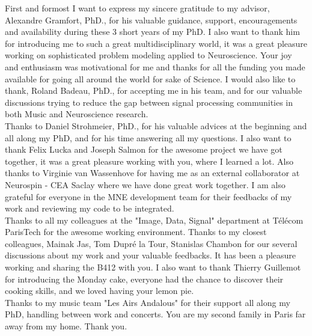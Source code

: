 
\begin{acknowledgements}
\addchaptertocentry{\acknowledgementname} %

First and formost I want to express my sincere gratitude to my advisor, Alexandre Gramfort, PhD., for his valuable guidance, support, encouragements and availability during these 3 short years of my PhD. I also want to thank him for introducing me to such a great multidisciplinary world, it was a great pleasure working on sophisticated problem modeling applied to Neuroscience. Your joy and enthusiasm was motivational for me and thanks for all the funding you made available for going all around the world for sake of Science. I would also like to thank, Roland Badeau, PhD., for accepting me in his team, and for our valuable discussions trying to reduce the gap between signal processing communities in both Music and Neuroscience research.\\

Thanks to Daniel Strohmeier, PhD., for his valuable advices at the beginning and all along my PhD, and for his time answering all my questions. I also want to thank Felix Lucka and Joseph Salmon for the awesome project we have got together, it was a great pleasure working with you, where I learned a lot. Also thanks to Virginie van Wassenhove for having me as an external collaborator at Neurospin - CEA Saclay where we have done great work together. I am also grateful for everyone in the MNE development team for their feedbacks of my work and reviewing my code to be integrated.
\\

Thanks to all my colleagues at the "Image, Data, Signal" department at Télécom ParisTech for the awesome working environment. Thanks to my closest colleagues, Mainak Jas, Tom Dupré la Tour, Stanislas Chambon for our several discussions about my work and your valuable feedbacks. It has been a pleasure working and sharing the B412 with you. I also want to thank Thierry Guillemot for introducing the Monday cake, everyone had the chance to discover their cooking skills, and we loved having your lemon pie.\\

Thanks to my music team "Les Airs Andalous" for their support all along my PhD, handling between work and concerts. You are my second family in Paris far away from my home. Thank you.\\


\end{acknowledgements}
